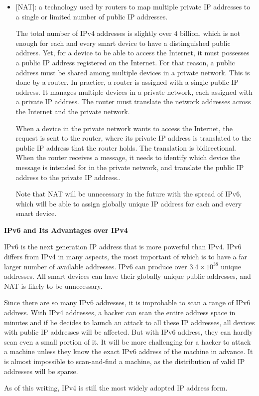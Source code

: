 \begin{itemize}
	\item {}[NAT]: a technology used by routers to map multiple private IP addresses to a single or limited number of public IP addresses.
	
	The total number of IPv4 addresses is slightly over $4$ billion, which is not enough for each and every smart device to have a distinguished public address. Yet, for a device to be able to access the Internet, it must possesses a public IP address registered on the Internet. For that reason, a public address must be shared among multiple devices in a private network. This is done by a router. In practice, a router is assigned with a single public IP address. It manages multiple devices in a private network, each assigned with a private IP address. The router must translate the network addresses across the Internet and the private network. 
	
	When a device in the private network wants to access the Internet, the request is sent to the router, where its private IP address is translated to the public IP address that the router holds. The translation is bidirectional. When the router receives a message, it needs to identify which device the message is intended for in the private network, and translate the public IP address to the private IP address..
	
	Note that NAT will be unnecessary in the future with the spread of IPv6, which will be able to assign globally unique IP address for each and every smart device.
\end{itemize}

\begin{mdframed}
\noindent \textbf{IPv6 and Its Advantages over IPv4}

IPv6 is the next generation IP address that is more powerful than IPv4. IPv6 differs from IPv4 in many aspects, the most important of which is to have a far larger number of available addresses. IPv6 can produce over $3.4\times 10^{38}$ unique addresses. All smart devices can have their globally unique public addresses, and NAT is likely to be unnecessary. 

Since there are so many IPv6 addresses, it is improbable to scan a range of IPv6 address. With IPv4 addresses, a hacker can scan the entire address space in minutes and if he decides to launch an attack to all these IP addresses, all devices with public IP addresses will be affected. But with IPv6 address, they can hardly scan even a small portion of it. It will be more challenging for a hacker to attack a machine unless they know the exact IPv6 address of the machine in advance. It is almost impossible to scan-and-find a machine, as the distribution of valid IP addresses will be sparse.

As of this writing, IPv4 is still the most widely adopted IP address form.

\end{mdframed}

